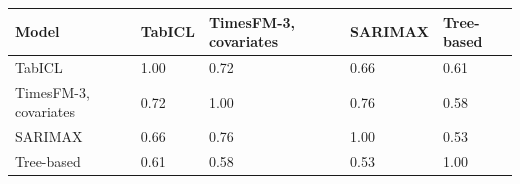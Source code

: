 \begin{tabular}{lllll}
\toprule
Model & TabICL & TimesFM-3, covariates & SARIMAX & Tree-based \\
\midrule
TabICL & 1.00 & 0.72 & 0.66 & 0.61 \\
TimesFM-3, covariates & 0.72 & 1.00 & 0.76 & 0.58 \\
SARIMAX & 0.66 & 0.76 & 1.00 & 0.53 \\
Tree-based & 0.61 & 0.58 & 0.53 & 1.00 \\
\bottomrule
\end{tabular}
